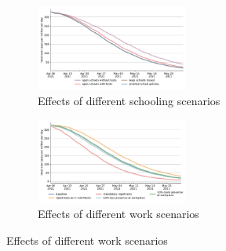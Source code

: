 \documentclass[varwidth, border=10pt, class=wlscirep, 10pt]{standalone}
\begin{document}
\begin{figure}
    \centering

    \begin{subfigure}[b]{6cm}
        \centering
        \includegraphics[width=5cm]{../figures/results/figures/scenario_comparisons/school_scenarios/full_newly_infected}
        \caption{{Effects of different schooling scenarios}}
        \label{fig:school_scenarios}
    \end{subfigure}
    \hfill
    \begin{subfigure}[b]{6cm}
        \centering
        \includegraphics[width=5cm]{../figures/results/figures/scenario_comparisons/new_work_scenarios/full_newly_infected}
        \caption{{Effects of different work scenarios}}
        \label{fig:workplace_scenarios}
    \end{subfigure}
\end{figure}
\end{document}
